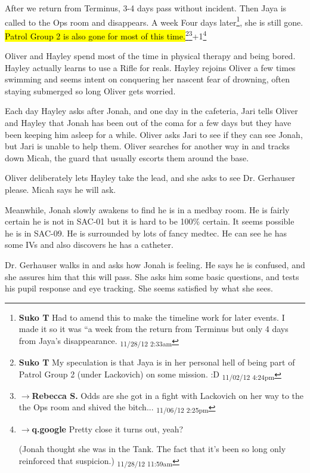 After we return from Terminus, 3-4 days pass without incident.  Then Jaya is called to the Ops room and disappears.  A week Four days later\footnote{\textbf{Suko T }Had to amend this to make the timeline work for later events.  I made it so it was ``a week from the return from Terminus but only 4 days from Jaya's disappearance. \textsubscript{11/28/12 2:33am}}, she is still gone.  \hl{Patrol Group 2 is also gone for most of this time.}\footnote{\textbf{Suko T }My speculation is that Jaya is in her personal hell of being part of Patrol Group 2 (under Lackovich) on some mission. :D \textsubscript{11/02/12 4:24pm}}\footnote{$\rightarrow$\textbf{Rebecca S. }Odds are she got in a fight with Lackovich on her way to the the Ops room and shived the bitch... \textsubscript{11/06/12 2:25pm}}+1\footnote{$\rightarrow$\textbf{q.google }Pretty close it turns out, yeah?

(Jonah thought she was in the Tank.  The fact that it's been so long only reinforced that suspicion.) \textsubscript{11/28/12 11:59am}}



Oliver and Hayley spend most of the time in physical therapy and being bored.  Hayley actually learns to use a Rifle for reals.  Hayley rejoins Oliver a few times swimming and seems intent on conquering her nascent fear of drowning, often staying submerged so long Oliver gets worried.



Each day Hayley asks after Jonah, and one day in the cafeteria, Jari tells Oliver and Hayley that Jonah has been out of the coma for a few days but they have been keeping him asleep for a while.  Oliver asks Jari to see if they can see Jonah, but Jari is unable to help them.  Oliver searches for another way in and tracks down Micah, the guard that usually escorts them around the base.



Oliver deliberately lets Hayley take the lead, and she asks to see Dr. Gerhauser please.  Micah says he will ask.



Meanwhile, Jonah slowly awakens to find he is in a medbay room.  He is fairly certain he is not in SAC-01 but it is hard to be 100\% certain.  It seems possible he is in SAC-09.  He is surrounded by lots of fancy medtec.  He can see he has some IVs and also discovers he has a catheter.



Dr. Gerhauser walks in and asks how Jonah is feeling.  He says he is confused, and she assures him that this will pass.  She asks him some basic questions, and tests his pupil response and eye tracking.  She seems satisfied by what she sees.



